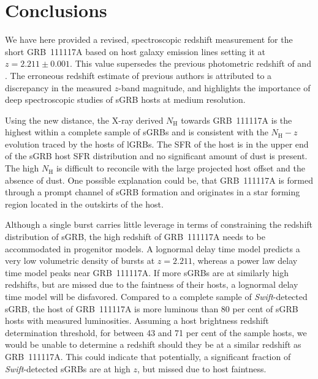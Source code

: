 \documentclass{aa}    %
\begin{document}
\section{Conclusions}

We have here provided a revised, spectroscopic redshift measurement for the
short GRB~111117A based on host galaxy emission lines setting it at $z = 2.211
\pm 0.001$. This value supersedes the previous photometric redshift of
\citet{Margutti2012} and \citet{Sakamoto2013}. The erroneous redshift estimate
of previous authors is attributed to a discrepancy in the measured $z$-band
magnitude, and highlights the importance of deep spectroscopic studies of sGRB
hosts at medium resolution.

Using the new distance, the X-ray derived $N_\mathrm{H}$ towards GRB~111117A is the
highest within a complete sample of sGRBs and is consistent with the
$N_\mathrm{H}-z$ evolution traced by the hosts of lGRBs. The SFR of the host is in the
upper end of the sGRB host SFR distribution and no significant amount of dust is
present. The high $N_\mathrm{H}$ is difficult to reconcile with the large projected host
offset and the absence of dust. One possible explanation could be, that
GRB~111117A is formed through a prompt channel of sGRB formation and originates
in a star forming region located in the outskirts of the host.

Although a single burst carries little leverage in terms of constraining the
redshift distribution of sGRB, the high redshift of GRB~111117A needs to be
accommodated in progenitor models. A lognormal delay time model predicts a very
low volumetric density of bursts at $z = 2.211$, whereas a power law delay time
model peaks near GRB~111117A. If more sGRBs are at similarly high redshifts, but
are missed due to the faintness of their hosts, a lognormal delay time model
will be disfavored. Compared to a complete sample of \textit{Swift}-detected
sGRB, the host of GRB~111117A is more luminous than 80 per cent of sGRB hosts
with measured luminosities. Assuming a host brightness redshift determination
threshold, for between 43 and 71 per cent of the sample hosts, we would be unable to
determine a redshift should they be at a similar redshift as GRB~111117A. This
could indicate that potentially, a significant fraction of
\textit{Swift}-detected sGRBs are at high $z$, but missed due to host faintness.
\end{document}
